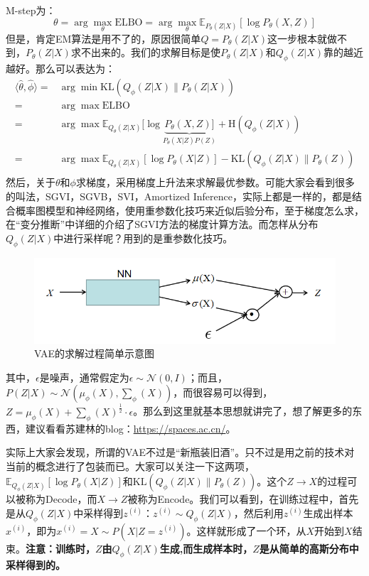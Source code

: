 \documentclass[a4paper]{article}
\begin{document}
M-step为：
\begin{equation}
    \theta = \arg\max_\theta \text{ELBO} = \arg\max_\theta \mathbb{E}_{P_\theta(Z
    |X)}[\log P_\theta(X,Z)]
\end{equation}
但是，肯定EM算法是用不了的，原因很简单$Q=P_\theta(Z|X)$这一步根本就做不到，$P_\theta(Z|X)$求不出来的。我们的求解目标是使$P_\theta(Z|X)$和$Q_\phi(Z|X)$靠的越近越好。那么可以表达为：
\begin{equation}
    \begin{split}
        \langle \hat{\theta}, \hat{\phi} \rangle = & \arg\min \text{KL}(Q_\phi(Z|X) \|P_\theta(Z|X) ) \\
        = & \arg\max \text{ELBO} \\
        = & \arg\max \mathbb{E}_{Q_\theta(Z|X)}[\log \underbrace{P_\theta(X,Z)]}_{P_\theta(X|Z)P(Z)} + \text{H}(Q_\phi(Z|X)) \\
        = & \arg\max \mathbb{E}_{Q_\theta(Z|X)}[\log P_\theta(X|Z)] - \text{KL}(Q_\phi(Z|X) \|P_\theta(Z)) \\
    \end{split}
\end{equation}
然后，关于$\theta$和$\phi$求梯度，采用梯度上升法来求解最优参数。可能大家会看到很多的叫法，SGVI，SGVB，SVI，Amortized Inference，实际上都是一样的，都是结合概率图模型和神经网络，使用重参数化技巧来近似后验分布，至于梯度怎么求，在“变分推断”中详细的介绍了SGVI方法的梯度计算方法。而怎样从分布$Q_\phi(Z|X)$中进行采样呢？用到的是重参数化技巧。
\begin{figure}[H]
    \centering
    \includegraphics[width=.75\textwidth]{微信图片_20200627182516.png}
    \caption{VAE的求解过程简单示意图}
    \label{fig:my_label_1}
\end{figure}
其中，$\epsilon$是噪声，通常假定为$\epsilon \sim \mathcal{N}(0,I)$；而且，$P(Z|X) \sim \mathcal{N}(\mu_\phi(X),\sum_\phi(X))$，而很容易可以得到，$Z = \mu_\phi(X) + \sum_\phi(X)^{\frac{1}{2}}\cdot \epsilon$。那么到这里就基本思想就讲完了，想了解更多的东西，建议看看苏建林的blog：\url{https://spaces.ac.cn/}。

实际上大家会发现，所谓的VAE不过是“新瓶装旧酒”。只不过是用之前的技术对当前的概念进行了包装而已。大家可以关注一下这两项，$\mathbb{E}_{Q_\phi(Z|X)}[\log P_\theta(X|Z)]$和$\text{KL}(Q_\phi(Z|X) \|P_\theta(Z))$。这个$Z\to X$的过程可以被称为Decode，而$X \to Z$被称为Encode。我们可以看到，在训练过程中，首先是从$Q_\phi(Z|X)$中采样得到$z^{(i)}$：$z^{(i)} \sim Q_\phi(Z|X)$，然后利用$z^{(i)}$生成出样本$x^{(i)}$，即为$x^{(i)} = X \sim P(X|Z=z^{(i)})$。这样就形成了一个环，从$X$开始到$X$结束。\textbf{注意：训练时，$Z$由$Q_\phi(Z|X)$生成,而生成样本时，$Z$是从简单的高斯分布中采样得到的。}
\end{document}

